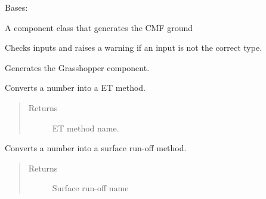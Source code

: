 \documentclass[letterpaper,10pt,english]{sphinxmanual}
\begin{document}
\begin{fulllineitems}
\label{\detokenize{cmf:livestock.components.comp_cmf.CMFGround}}
Bases: {\hyperref[\detokenize{superclass:livestock.components.component.GHComponent}]{}}

A component class that generates the CMF ground

\begin{fulllineitems}
\label{\detokenize{cmf:livestock.components.comp_cmf.CMFGround.check_inputs}}
Checks inputs and raises a warning if an input is not the correct type.

\end{fulllineitems}


\begin{fulllineitems}
\label{\detokenize{cmf:livestock.components.comp_cmf.CMFGround.config}}
Generates the Grasshopper component.

\end{fulllineitems}


\begin{fulllineitems}
\label{\detokenize{cmf:livestock.components.comp_cmf.CMFGround.convert_et_number_to_method}}
Converts a number into a ET method.
\begin{quote}\begin{description}
\item[{Returns}] \leavevmode
ET method name.

\end{description}\end{quote}

\end{fulllineitems}


\begin{fulllineitems}
\label{\detokenize{cmf:livestock.components.comp_cmf.CMFGround.convert_runoff_number_to_method}}
Converts a number into a surface run-off method.
\begin{quote}\begin{description}
\item[{Returns}] \leavevmode
Surface run-off name


\end{description}
\end{quote}
\end{fulllineitems}
\end{fulllineitems}
\end{document}
